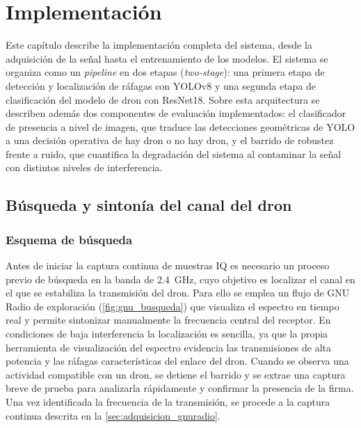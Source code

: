 \chapter{Implementación}
\label{cap:implementacion}

Este capítulo describe la implementación completa del sistema, desde la adquisición de la señal hasta el entrenamiento de los modelos. El sistema se organiza como un \emph{pipeline} en dos etapas (\emph{two-stage}): una primera etapa de detección y localización de ráfagas con YOLOv8 y una segunda etapa de clasificación del modelo de dron con ResNet18. Sobre esta arquitectura se describen además dos componentes de evaluación implementados: el clasificador de presencia a nivel de imagen, que traduce las detecciones geométricas de YOLO a una decisión operativa de hay dron o no hay dron, y el barrido de robustez frente a ruido, que cuantifica la degradación del sistema al contaminar la señal con distintos niveles de interferencia.


\section{Búsqueda y sintonía del canal del dron}

\subsection{Esquema de búsqueda}

Antes de iniciar la captura continua de muestras IQ es necesario un proceso previo de búsqueda en la banda de \SI{2.4}{\giga\hertz}, cuyo objetivo es localizar el canal en el que se estabiliza la transmisión del dron. Para ello se emplea un flujo de GNU Radio de exploración (\cref{fig:gnu_busqueda}) que visualiza el espectro en tiempo real y permite sintonizar manualmente la frecuencia central del receptor. En condiciones de baja interferencia la localización es sencilla, ya que la propia herramienta de visualización del espectro evidencia las transmisiones de alta potencia y las ráfagas características del enlace del dron. Cuando se observa una actividad compatible con un dron, se detiene el barrido y se extrae una captura breve de prueba para analizarla rápidamente y confirmar la presencia de la firma. Una vez identificada la frecuencia de la transmisión, se procede a la captura continua descrita en la \cref{sec:adquisicion_gnuradio}.

